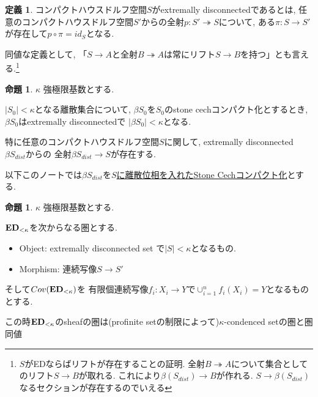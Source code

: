 \documentclass[dvipdfmx,a4paper,11pt]{report}
\theoremstyle{definition}
\newtheorem{prop}[thm]{命題}
\newtheorem{dfn}[thm]{定義}
\begin{document}
  
 \begin{tcolorbox}
 [colback = white, colframe = green!35!black, fonttitle = \bfseries,breakable = true]
\begin{dfn}\cite[Definition 2.4]{Sch19}
コンパクトハウスドルフ空間$S$がextremally disconnectedであるとは, 任意のコンパクトハウスドルフ空間$S'$からの全射$ p : S '  \twoheadrightarrow S$について, ある$\pi : S \to S'$が存在して$p \circ \pi = id_{S}$となる. 
 \end{dfn}
 \end{tcolorbox}
 
 同値な定義として, 「$S \to A$と全射$B \twoheadrightarrow A$は常にリフト$S \to B$を持つ」とも言える.\footnote{$S$がEDならばリフトが存在することの証明. 全射$B \twoheadrightarrow A$について集合としてのリフト$S \to B$が取れる. これにより$\beta(S_{dist}) \to B$が作れる. $S \to \beta(S_{dist})$なるセクションが存在するのでいえる}
 
 
   \begin{tcolorbox}
 [colback = white, colframe = green!35!black, fonttitle = \bfseries,breakable = true]
\begin{prop}\cite[Example 2.5]{Sch19}
\label{prop-sch-exa2.5}
$\kappa$ 強極限基数とする.

$|S_0| <\kappa$となる離散集合について, 
$\beta S_0$を$S_0$のstone cechコンパクト化とするとき,
 $\beta S_0$はextremally disconnectedで
$|\beta S_0 | < \kappa$となる.

特に任意のコンパクトハウスドルフ空間$S$に関して, extremally disconnected $\beta S_{dist}$からの
全射$\beta S_{dist} \to S$が存在する. 

 \end{prop}
 \end{tcolorbox}
 
 以下このノートでは$\beta S_{dist}$を\underline{$S$に離散位相を入れたStone Cechコンパクト化}とする. 
 
   \begin{tcolorbox}
 [colback = white, colframe = green!35!black, fonttitle = \bfseries,breakable = true]
\begin{prop}\cite[Example 2.5]{Sch19}
$\kappa$ 強極限基数とする.

${\bf ED}_{< \kappa}$を次からなる圏とする.
\begin{itemize}
\item Object: extremally disconnected set で$|S| < \kappa$となるもの. 
\item Morphism: 連続写像$S \to S'$
\end{itemize}

そして$Cov({\bf ED}_{< \kappa})$を
有限個連続写像$f_i : X_i \to Y$で$\cup_{i=1}^{n}f_i(X_i) =Y$となるものとする. 

この時${\bf ED}_{< \kappa}$のsheafの圏は(profinite setの制限によって)$\kappa$-condenced setの圏と圏同値
 \end{prop}
 \end{tcolorbox}
 
\end{document}
